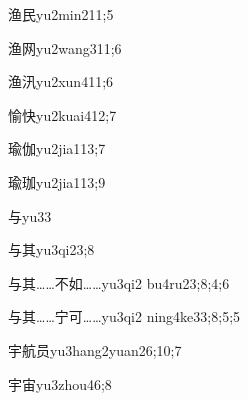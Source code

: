 \begin{verbete}{渔民}{yu2min2}{11;5}
\end{verbete}

\begin{verbete}{渔网}{yu2wang3}{11;6}
\end{verbete}

\begin{verbete}{渔汛}{yu2xun4}{11;6}
\end{verbete}

\begin{verbete}{愉快}{yu2kuai4}{12;7}
\end{verbete}

\begin{verbete}{瑜伽}{yu2jia1}{13;7}
\end{verbete}

\begin{verbete}{瑜珈}{yu2jia1}{13;9}
\end{verbete}

\begin{verbete}{与}{yu3}{3}
\end{verbete}

\begin{verbete}{与其}{yu3qi2}{3;8}
\end{verbete}

\begin{verbete}{与其……不如……}{yu3qi2 bu4ru2}{3;8;4;6}
\end{verbete}

\begin{verbete}{与其……宁可……}{yu3qi2 ning4ke3}{3;8;5;5}
\end{verbete}

\begin{verbete}{宇航员}{yu3hang2yuan2}{6;10;7}
\end{verbete}

\begin{verbete}{宇宙}{yu3zhou4}{6;8}
\end{verbete}

